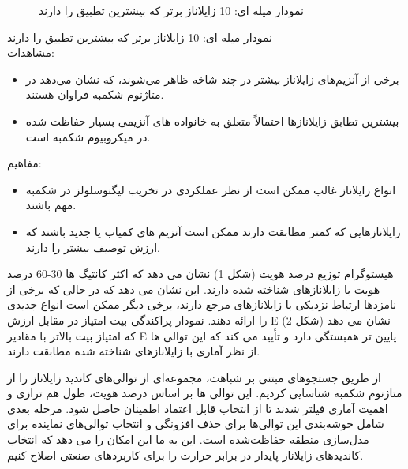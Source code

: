 \begin{enumerate}[label=\alph*-]
\begin{figure}[H]
                \caption{نمودار میله ای: 10 زایلاناز برتر که بیشترین تطبیق را دارند}
                \label{fig:top_freq}
            \end{figure}
            نمودار میله ای: 10 زایلاناز برتر که بیشترین تطبیق را دارند\\
            مشاهدات:
            \begin{itemize}
                \item برخی از آنزیم‌های زایلاناز بیشتر در چند شاخه ظاهر می‌شوند، که نشان می‌دهد در متاژنوم شکمبه فراوان هستند.
                \item بیشترین تطابق زایلانازها احتمالاً متعلق به خانواده های آنزیمی بسیار حفاظت شده در میکروبیوم شکمبه است.
            \end{itemize}
            مفاهیم:
            \begin{itemize}
                \item انواع زایلاناز غالب ممکن است از نظر عملکردی در تخریب لیگنوسلولز در شکمبه مهم باشند.
                \item زایلانازهایی که کمتر مطابقت دارند ممکن است آنزیم های کمیاب یا جدید باشند که ارزش توصیف بیشتر را دارند.
            \end{itemize}
        \end{enumerate}

        هیستوگرام توزیع درصد هویت (شکل 1) نشان می دهد که اکثر کانتیگ ها 30-60 درصد هویت با زایلانازهای شناخته شده دارند. این نشان می دهد که در حالی که برخی از نامزدها ارتباط نزدیکی با زایلانازهای مرجع دارند، برخی دیگر ممکن است انواع جدیدی را ارائه دهند. نمودار پراکندگی بیت امتیاز در مقابل ارزش E (شکل 2) نشان می دهد که امتیاز بیت بالاتر با مقادیر E پایین تر همبستگی دارد و تأیید می کند که این توالی ها از نظر آماری با زایلانازهای شناخته شده مطابقت دارند.

        از طریق جستجوهای مبتنی بر شباهت، مجموعه‌ای از توالی‌های کاندید زایلاناز را از متاژنوم شکمبه شناسایی کردیم. این توالی ها بر اساس درصد هویت، طول هم ترازی و اهمیت آماری فیلتر شدند تا از انتخاب قابل اعتماد اطمینان حاصل شود. مرحله بعدی شامل خوشه‌بندی این توالی‌ها برای حذف افزونگی و انتخاب توالی‌های نماینده برای مدل‌سازی منطقه حفاظت‌شده است. این به ما این امکان را می دهد که انتخاب کاندیدهای زایلاناز پایدار در برابر حرارت را برای کاربردهای صنعتی اصلاح کنیم.
